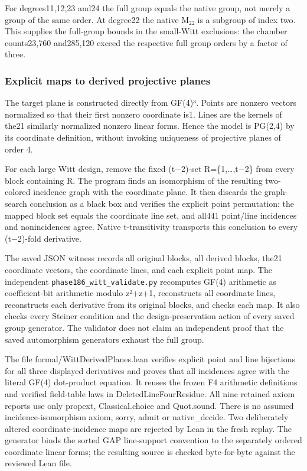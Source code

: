 For degrees11,12,23 and24 the full group equals the native group, not
merely a group of the same order. At degree22 the native M₂₂ is a
subgroup of index two. This supplies the full-group bounds in the
small-Witt exclusions: the chamber counts23,760 and285,120 exceed the
respective full group orders by a factor of three.

\subsubsection{Explicit maps to derived projective
planes}\label{explicit-maps-to-derived-projective-planes}

The target plane is constructed directly from GF(4)³. Points are nonzero
vectors normalized so that their first nonzero coordinate is1. Lines are
the kernels of the21 similarly normalized nonzero linear forms. Hence
the model is PG(2,4) by its coordinate definition, without invoking
uniqueness of projective planes of order 4.

For each large Witt design, remove the fixed (t−2)-set
R=\{1,\ldots,t−2\} from every block containing R. The program finds an
isomorphism of the resulting two-colored incidence graph with the
coordinate plane. It then discards the graph-search conclusion as a
black box and verifies the explicit point permutation: the mapped block
set equals the coordinate line set, and all441 point/line incidences and
nonincidences agree. Native t-transitivity transports this conclusion to
every (t−2)-fold derivative.

The saved JSON witness records all original blocks, all derived blocks,
the21 coordinate vectors, the coordinate lines, and each explicit point
map. The independent \texttt{phase186\_witt\_validate.py} recomputes GF(4)
arithmetic as coefficient-bit arithmetic modulo z²+z+1, reconstructs all
coordinate lines, reconstructs each derivative from its original blocks,
and checks each map. It also checks every Steiner condition and the
design-preservation action of every saved group generator. The validator
does not claim an independent proof that the saved automorphism
generators exhaust the full group.

The file formal/WittDerivedPlanes.lean verifies explicit point and line
bijections for all three displayed derivatives and proves that all
incidences agree with the literal GF(4) dot-product equation. It reuses
the frozen F4 arithmetic definitions and verified field-table laws in
DeletedLineFourResidue. All nine retained axiom reports use only propext,
Classical.choice and Quot.sound. There is no assumed
incidence-isomorphism axiom, sorry, admit or native\_decide. Two
deliberately altered coordinate-incidence maps are rejected by Lean in
the fresh replay. The generator binds the sorted GAP line-support
convention to the separately ordered coordinate linear forms; the
resulting source is checked byte-for-byte against the reviewed Lean
file.

